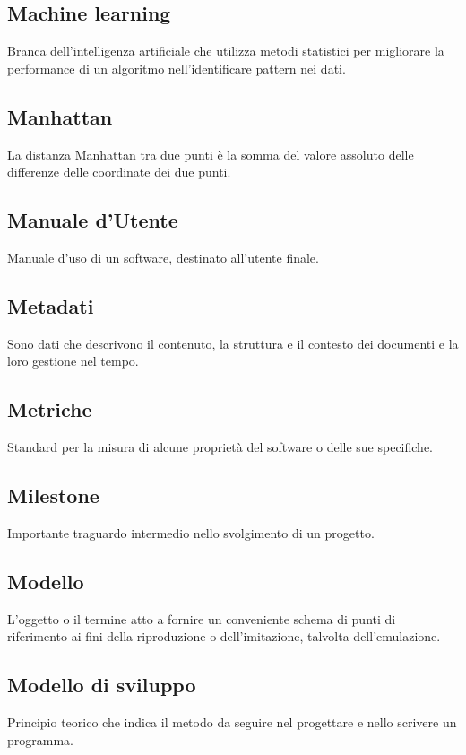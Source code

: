 \documentclass[../glossario.tex]{subfiles}
\begin{document}
\subsection*{Machine learning} 
Branca dell'intelligenza artificiale che utilizza metodi statistici per migliorare la performance di un algoritmo nell'identificare pattern nei dati.


\subsection*{Manhattan} 
La distanza Manhattan tra due punti è la somma del valore assoluto delle differenze delle coordinate dei due punti.

\subsection*{Manuale d'Utente} 
Manuale d'uso di un software, destinato all'utente finale.

\subsection*{Metadati}
Sono dati che descrivono il contenuto, la struttura e il contesto dei documenti e la loro gestione nel tempo.


\subsection*{Metriche} 
Standard per la misura di alcune proprietà del software o delle sue specifiche.

\subsection*{Milestone} 
Importante traguardo intermedio nello svolgimento di un progetto.

\subsection*{Modello} 
L'oggetto o il termine atto a fornire un conveniente schema di punti di riferimento ai fini della riproduzione o dell'imitazione, talvolta dell'emulazione.

\subsection*{Modello di sviluppo} 
Principio teorico che indica il metodo da seguire nel progettare e nello scrivere un programma.

    
\end{document}
